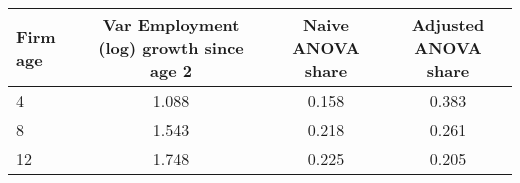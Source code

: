 \begin{tabular}{lccc}
Firm age & Var Employment (log) growth since age 2 & Naive ANOVA share & Adjusted ANOVA share \\
\hline
4 &     1.088 &  0.158 &  0.383 \\
8 &     1.543 &  0.218 &  0.261 \\
12 &     1.748 &  0.225 &  0.205 \\
\end{tabular}
